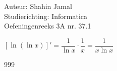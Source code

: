 \documentclass[a4paper]{article}
\begin{document}
  
\noindent \large Auteur: Shahin Jamal \\
\noindent \large Studierichting: Informatica\\
\noindent \large Oefeningenreeks 3A nr. 37.1\\

\medskip

\normalsize

$\left[\ln(\ln x)\right]' = \dfrac{1}{\ln x} \cdot \dfrac{1}{x} = \dfrac{1}{x \ln x}$\\

\begin{thebibliography}{999}
\end{thebibliography}
\end{document}
